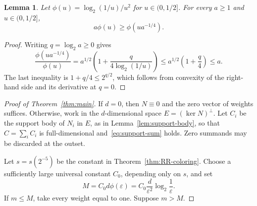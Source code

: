 \documentclass[11pt]{article}
\newtheorem{lemma}[theorem]{Lemma}
\theoremstyle{remark}
\newcommand{\eps}{\varepsilon}
\begin{document}
\begin{lemma}\label{lem:phi}
Let $\phi(u)=\log_2(1/u)/u^2$ for $u\in(0,1/2]$.  For every
$a\geq1$ and $u\in(0,1/2]$,
\[
  a\phi(u)\geq\phi(ua^{-1/4}).
\]
\end{lemma}

\begin{proof}
Writing $q=\log_2a\geq0$ gives
\[
  \frac{\phi(ua^{-1/4})}{\phi(u)}
  =a^{1/2}\left(1+\frac{q}{4\log_2(1/u)}\right)
  \leq a^{1/2}\left(1+\frac q4\right)
  \leq a.
\]
The last inequality is $1+q/4\leq2^{q/2}$, which follows from
convexity of the right-hand side and its derivative at $q=0$.
\end{proof}

\begin{proof}[Proof of Theorem~\ref{thm:main}]
If $d=0$, then $N\equiv0$ and the zero vector of weights suffices.
Otherwise, work in the $d$-dimensional space
$E=(\ker N)^\perp$.  Let $C_i$ be the support body of $N_i$ in $E$,
as in Lemma~\ref{lem:support-body}, so that
$C=\sum_iC_i$ is full-dimensional and~\eqref{eq:support-sum} holds.
Zero summands may be discarded at the outset.

Let $s=s(2^{-5})$ be the constant in
Theorem~\ref{thm:RR-coloring}.  Choose a sufficiently large universal
constant $C_0$, depending only on $s$, and set
\[
  M=C_0d\phi(\eps)
  =C_0\frac{d}{\eps^2}\log_2\frac1\eps.
\]
If $m\leq M$, take every weight equal to one.  Suppose $m>M$.


\end{proof}
\end{document}
